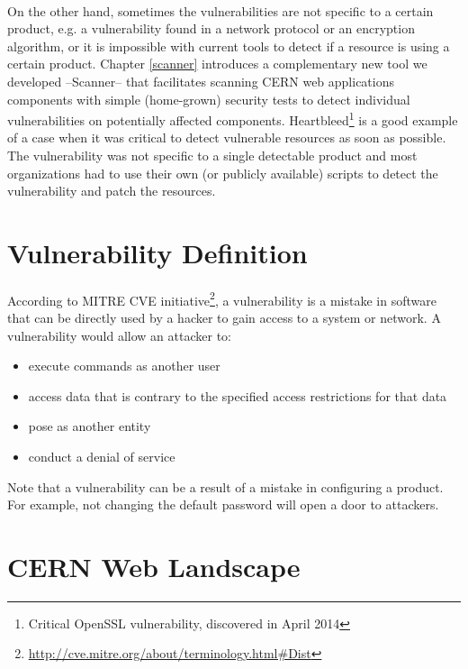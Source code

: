\paragraph{}
On the other hand, sometimes the vulnerabilities are not specific to a certain product, e.g. a vulnerability found in a network protocol or an encryption algorithm, or it is impossible with current tools to detect if a resource is using a certain product. Chapter \ref{scanner} introduces a complementary new tool we developed --Scanner-- that facilitates scanning CERN web applications components with simple (home-grown) security tests to detect individual vulnerabilities on potentially affected components. Heartbleed\footnote{Critical OpenSSL vulnerability, discovered in April 2014} is a good example of a case when it was critical to detect vulnerable resources as soon as possible. The vulnerability was not specific to a single detectable product and most organizations had to use their own (or publicly available) scripts to detect the vulnerability and patch the resources.

\section{Vulnerability Definition}
\paragraph{}
According to MITRE CVE initiative\footnote{\url{http://cve.mitre.org/about/terminology.html\#Dist}}, a vulnerability is a mistake in software that can be directly used by a hacker to gain access to a system or network. A vulnerability would allow an attacker to:
\begin{itemize}
\item execute commands as another user
\item access data that is contrary to the specified access restrictions for that data
\item pose as another entity
\item conduct a denial of service
\end{itemize}

Note that a vulnerability can be a result of a mistake in configuring a product. For example, not changing the default password will open a door to attackers. 

\section{CERN Web Landscape}
